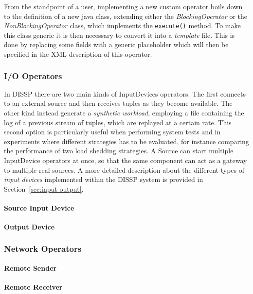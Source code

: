 			
From the standpoint of a user, implementing a new custom operator boils down to the definition of
a new java class, extending either the \textit{BlockingOperator} or the \textit{NonBlockingOperator} class,
which implements the \texttt{execute()} method. To make this class generic it is then necessary to
convert it into a \textit{template} file. This is done by replacing some fields with a generic placeholder
which will then be specified in the XML description of this operator.

	
	
		\subsubsection*{I/O Operators}
		\label{sec:input-output}
In DISSP there are two main kinds of InputDevices operators. The first connects to an external source and 
then receives tuples as they become available. The other kind instead generate a \emph{synthetic
workload}, employing a file containing the log of a previous stream of tuples, which are replayed at a
certain rate. This second option is particularly useful when performing system tests and in experiments
where different strategies has to be evaluated, for instance comparing the performance of two load
shedding strategies. A Source can start multiple InputDevice operators at once, so that the same
component can act as a gateway to multiple real sources.
A more detailed description about the different types of \emph{input devices} implemented within the
DISSP system is provided in Section~\ref{sec:input-output}.		
			\paragraph{Source Input Device}
			\paragraph{Output Device}
		
		\subsubsection*{Network Operators}
		\label{sec:network-op}	
			\paragraph{Remote Sender}
			\paragraph{Remote Receiver}
		
